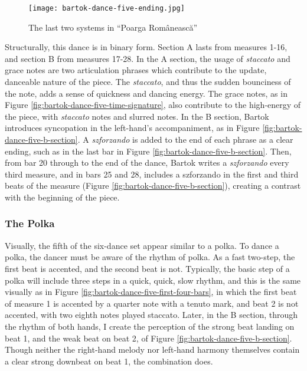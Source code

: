 \begin{figure}
  \centering
  \texttt{[image: bartok-dance-five-ending.jpg]}
  \caption[The last two systems in ``Poarga Românească'' of Bartok's \textit{Romanian Folk Dances, Sz. 56, BB 68}]{The last two systems in ``Poarga Românească''}
  \label{fig:bartok-dance-five-ending}
\end{figure}


Structurally, this dance is in binary form. Section A lasts from measures 1-16, and section B from measures 17-28. In the A section, the usage of \textit{staccato} and grace notes are two articulation phrases which contribute to the update, danceable nature of the piece. The \textit{staccato}, and thus the sudden bounciness of the note, adds a sense of quickness and dancing energy. The grace notes, as in Figure \ref{fig:bartok-dance-five-time-signature}\autocite{Lung_2016}, also contribute to the high-energy of the piece, with \textit{staccato} notes and slurred notes. In the B section, Bartok introduces syncopation in the left-hand's accompaniment, as in Figure \ref{fig:bartok-dance-five-b-section}\autocite{Lung_2016}. A \textit{szforzando} is added to the end of each phrase as a clear ending, such as in the last bar in Figure \ref{fig:bartok-dance-five-b-section}\autocite{Lung_2016}. Then, from bar 20 through to the end of the dance, Bartok writes a \textit{szforzando} every third measure, and in bars 25 and 28, includes a szforzando in the first and third beats of the measure (Figure \ref{fig:bartok-dance-five-b-section}\autocite{Lung_2016}), creating a contrast with the beginning of the piece. 

\subsubsection{The Polka}

Visually, the fifth of the six-dance set appear similar to a polka. To dance a polka, the dancer must be aware of the rhythm of polka. As a fast two-step, the first beat is accented, and the second beat is not. Typically, the basic step of a polka will include three steps in a quick, quick, slow rhythm, and this is the same visually as in Figure \ref{fig:bartok-dance-five-first-four-bars}\autocite{Lung_2016}, in which the first beat of measure 1 is accented by a quarter note with a tenuto mark, and beat 2 is not accented, with two eighth notes played staccato. Later, in the B section, through the rhythm of both hands, I create the perception of the strong beat landing on beat 1, and the weak beat on beat 2, of Figure \ref{fig:bartok-dance-five-b-section}\autocite{Lung_2016}. Though neither the right-hand melody nor left-hand harmony themselves contain a clear strong downbeat on beat 1, the combination does. 

